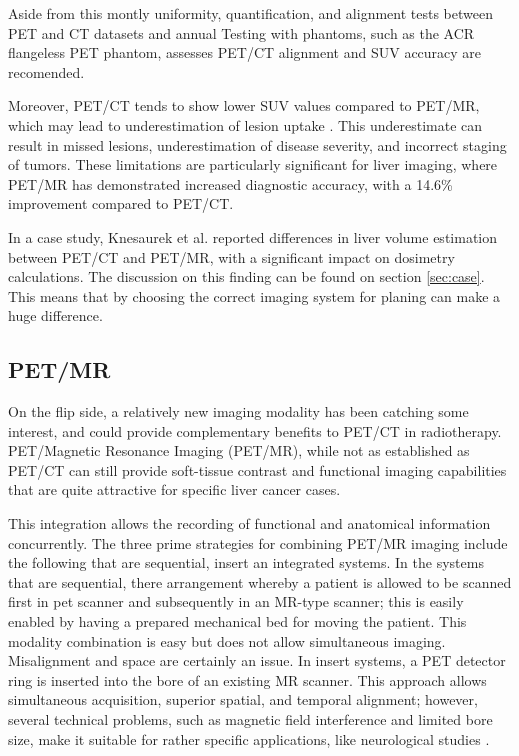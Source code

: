 \begin{multicols}{2}
Aside from this montly uniformity, quantification, and alignment tests between PET and CT datasets and annual Testing with phantoms, such as the ACR flangeless PET phantom, assesses PET/CT alignment and SUV accuracy are recomended.

Moreover, PET/CT tends to show lower SUV values compared to PET/MR, which may lead to underestimation of lesion uptake \cite{Prado-Wohlwend2023}. This underestimate can result in missed lesions, underestimation of disease severity, and incorrect staging of tumors. These limitations are particularly significant for liver imaging, where PET/MR has demonstrated increased diagnostic accuracy, with a 14.6\% improvement compared to PET/CT\cite{Prado-Wohlwend2023}.

In a case study, Knesaurek et al. \cite{knesaurek2018} reported differences in liver volume estimation between PET/CT and PET/MR, with a significant impact on dosimetry calculations. The discussion on this finding can be found on section \ref{sec:case}. This means that by choosing the correct imaging system for planing can make a huge difference. 


\subsection{PET/MR}
On the flip side, a relatively new imaging modality has been catching some interest, and could provide complementary benefits to PET/CT in radiotherapy. PET/Magnetic Resonance Imaging (PET/MR), while not as established as PET/CT can still provide soft-tissue contrast and functional imaging capabilities that are quite attractive for specific liver cancer cases.

This integration allows the recording of functional and anatomical information concurrently. The three prime strategies for combining PET/MR imaging include the following that are sequential, insert an integrated systems. In the systems that are sequential, there arrangement whereby a patient is allowed to be scanned first in pet scanner and subsequently in an MR-type scanner; this is easily enabled by having a prepared mechanical bed for moving the patient. This modality combination is easy but does not allow  simultaneous imaging. Misalignment and space are certainly an issue. In insert systems, a PET detector ring is inserted into the bore of an existing MR scanner. This approach allows simultaneous acquisition, superior spatial, and temporal alignment; however, several technical problems, such as magnetic field interference and limited bore size, make it suitable for rather specific applications, like neurological studies \cite{ziegler2013}.


\end{multicols}
